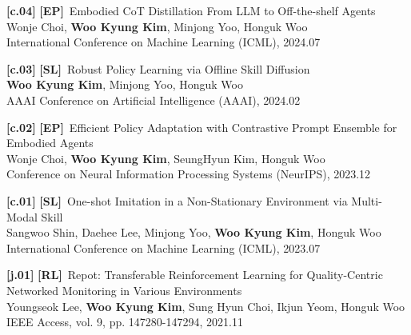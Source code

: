 \documentclass[letterpaper,11pt]{article}
\newcommand{\RL}{\textbf{\textcolor{RLgreen}{[RL]}}}
\newcommand{\SL}{\textbf{\textcolor{SLpurple}{[SL]}}}
\newcommand{\EP}{\textbf{\textcolor{EPblue}{[EP]}}}
\newcommand{\resumeSubHeadingListStart}{\begin{itemize}[leftmargin=0.15in, label={}]}
\begin{document}
\begin{itemize}[leftmargin=0.15in, label={}]
{{    \textbf{[c.04]} \EP \ {Embodied CoT Distillation From LLM to Off-the-shelf Agents} \\
    {Wonje Choi, \textbf{Woo Kyung Kim}, Minjong Yoo, Honguk Woo} \\
    {International Conference on Machine Learning (ICML), 2024.07} \\
    \vspace{1.5mm}

    \textbf{[c.03]} \SL \ {Robust Policy Learning via Offline Skill Diffusion} \\
    {\textbf{Woo Kyung Kim}, Minjong Yoo, Honguk Woo} \\
    {AAAI Conference on Artificial Intelligence (AAAI), 2024.02} \\
    \vspace{1.5mm}

    \textbf{[c.02]} \EP \ {Efficient Policy Adaptation with Contrastive Prompt Ensemble for Embodied Agents} \\
    {Wonje Choi, \textbf{Woo Kyung Kim}, SeungHyun Kim, Honguk Woo} \\
    {Conference on Neural Information Processing Systems (NeurIPS), 2023.12} \\
    \vspace{1.5mm}

    \textbf{[c.01]} \SL \ {One-shot Imitation in a Non-Stationary Environment via Multi-Modal Skill} \\
    {Sangwoo Shin, Daehee Lee, Minjong Yoo, \textbf{Woo Kyung Kim}, Honguk Woo} \\
    {International Conference on Machine Learning (ICML), 2023.07} \\
    \vspace{1.5mm}

    \textbf{[j.01]} \RL \ {Repot: Transferable Reinforcement Learning for Quality-Centric Networked Monitoring in Various Environments} \\
    {Youngseok Lee, \textbf{Woo Kyung Kim}, Sung Hyun Choi, Ikjun Yeom, Honguk Woo} \\
    {IEEE Access, vol. 9, pp. 147280-147294, 2021.11} \\
    }}
 \end{itemize}

\end{document}
